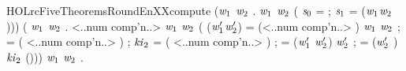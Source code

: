 \newcommand{\HOLrcFiveTheoremsRoundEnXXaltXXhalfXXmessageEn}{\UseVerbatim{HOLrcFiveTheoremsRoundEnXXaltXXhalfXXmessageEn}}
\begin{SaveVerbatim}{HOLrcFiveTheoremsRoundEnXXcompute}
\HOLTokenTurnstile{} (\HOLSymConst{\HOLTokenForall{}}\ensuremath{\HOLBoundVar{w}\sb{\mathrm{1}}} \ensuremath{\HOLBoundVar{w}\sb{\mathrm{2}}} .
        \ensuremath{\HOLBoundVar{w}\sb{\mathrm{1}}} \ensuremath{\HOLBoundVar{w}\sb{\mathrm{2}}}  \HOLSymConst{=}
      ( \ensuremath{\HOLBoundVar{s}\sb{\mathrm{0}}} =   ; \ensuremath{\HOLBoundVar{s}\sb{\mathrm{1}}} =     (\ensuremath{\HOLBoundVar{w}\sb{\mathrm{1}}}\HOLSymConst{,}\ensuremath{\HOLBoundVar{w}\sb{\mathrm{2}}}))) \HOLSymConst{\HOLTokenConj{}}
   (\HOLSymConst{\HOLTokenForall{}} \ensuremath{\HOLBoundVar{w}\sb{\mathrm{1}}} \ensuremath{\HOLBoundVar{w}\sb{\mathrm{2}}} .
       <..num comp'n..> \ensuremath{\HOLBoundVar{w}\sb{\mathrm{1}}} \ensuremath{\HOLBoundVar{w}\sb{\mathrm{2}}}  \HOLSymConst{=}
      (
         (\ensuremath{\HOLBoundVar{w}\sb{\mathrm{1}}\sp{\prime{}}}\HOLSymConst{,}\ensuremath{\HOLBoundVar{w}\sb{\mathrm{2}}\sp{\prime{}}}) =  (<..num comp'n..> \HOLSymConst{\ensuremath{-}} ) \ensuremath{\HOLBoundVar{w}\sb{\mathrm{1}}} \ensuremath{\HOLBoundVar{w}\sb{\mathrm{2}}} ;
          =  ( \HOLSymConst{\HOLTokenProd{}} <..num comp'n..> ) ;
         \ensuremath{\HOLBoundVar{ki}\sb{\mathrm{2}}} =  ( \HOLSymConst{\HOLTokenProd{}} <..num comp'n..> \HOLSymConst{\ensuremath{+}} ) ;
          = (\ensuremath{\HOLBoundVar{w}\sb{\mathrm{1}}\sp{\prime{}}} \HOLSymConst{\HOLTokenEor{}} \ensuremath{\HOLBoundVar{w}\sb{\mathrm{2}}\sp{\prime{}}}) \HOLSymConst{\HOLTokenRol{}}  \ensuremath{\HOLBoundVar{w}\sb{\mathrm{2}}\sp{\prime{}}} \HOLSymConst{\ensuremath{+}} ;
          = (\ensuremath{\HOLBoundVar{w}\sb{\mathrm{2}}\sp{\prime{}}} \HOLSymConst{\HOLTokenEor{}} ) \HOLSymConst{\HOLTokenRol{}}   \HOLSymConst{\ensuremath{+}} \ensuremath{\HOLBoundVar{ki}\sb{\mathrm{2}}}
         (\HOLSymConst{,}))) \HOLSymConst{\HOLTokenConj{}}
   \HOLSymConst{\HOLTokenForall{}} \ensuremath{\HOLBoundVar{w}\sb{\mathrm{1}}} \ensuremath{\HOLBoundVar{w}\sb{\mathrm{2}}} .

\end{SaveVerbatim}
